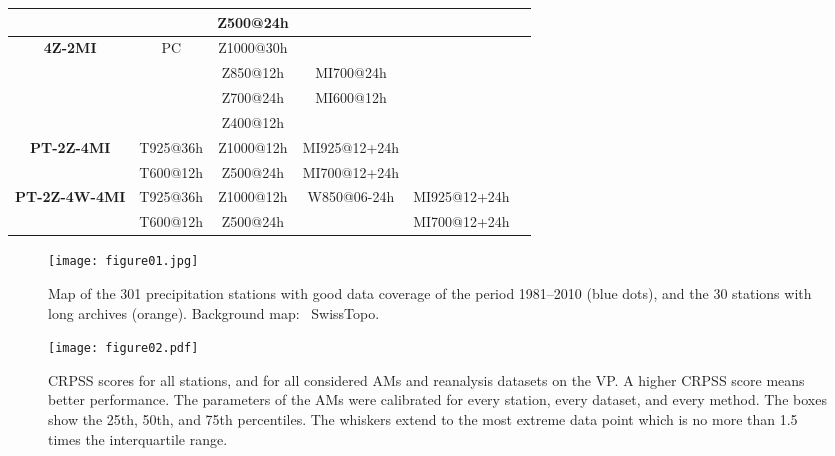 \documentclass[smallextended]{svjour3}       %
\begin{document}
\begin{table*}[t]
\begin{center}
\begin{tabular}{cccccl}
				&& Z500@24h &&& \\
				\hline 
				\multirow{4}{*}{\textbf{4Z-2MI}} & \multirow{4}{*}{PC} & Z1000@30h &&& \multirow{4}{*}{\citealt{Horton2017b}}\\
				&& Z850@12h & MI700@24h && \\
				&& Z700@24h & MI600@12h && \\
				&& Z400@12h &&& \\
				\hline 
				\multirow{2}{*}{\textbf{PT-2Z-4MI}} & T925@36h & Z1000@12h & MI925@12+24h && \multirow{2}{*}{\citealt{BenDaoud2016}} \\
				& T600@12h & Z500@24h & MI700@12+24h && \\
				\hline 
				\multirow{2}{*}{\textbf{PT-2Z-4W-4MI}} & T925@36h & Z1000@12h & \multirow{2}{*}{W850@06-24h} & MI925@12+24h & \multirow{2}{*}{\citealt{BenDaoud2016}} \\
				& T600@12h & Z500@24h && MI700@12+24h & \\
				\hline 
				
			\end{tabular} 
		\end{center}
		\label{table:methods}
	\end{table*}

	
	\clearpage
	
	

	
	\begin{figure}
		\texttt{[image: figure01.jpg]}\\
		\caption{Map of the 301 precipitation stations with good data coverage of the period 1981--2010 (blue dots), and the 30 stations with long archives (orange). Background map: \textcopyright\ SwissTopo.}
		\label{fig:stations}
	\end{figure}
	
	\begin{figure*}
		\texttt{[image: figure02.pdf]}\\
		\caption{CRPSS scores for all stations, and for all considered AMs and reanalysis datasets on the VP. A higher CRPSS score means better performance. The parameters of the AMs were calibrated for every station, every dataset, and every method. The boxes show the 25th, 50th, and 75th percentiles. The whiskers extend to the most extreme data point which is no more than 1.5 times the interquartile range.}
		\label{fig:comparison_values}
	\end{figure*}
	
\end{document}

